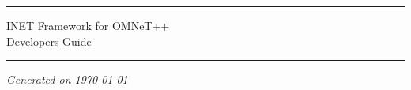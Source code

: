 

\begin{center}\end{center}
\vspace{16em}
\hrule
\vspace{2em}
\begin{center}
{\LARGE INET Framework for OMNeT++}\\
\vspace{1em}
{\large Developers Guide}\\
\end{center}
\vspace{2em}
\hrule


\vspace{8em}

\begin{center}
\textit{Generated on \today}
\end{center}



